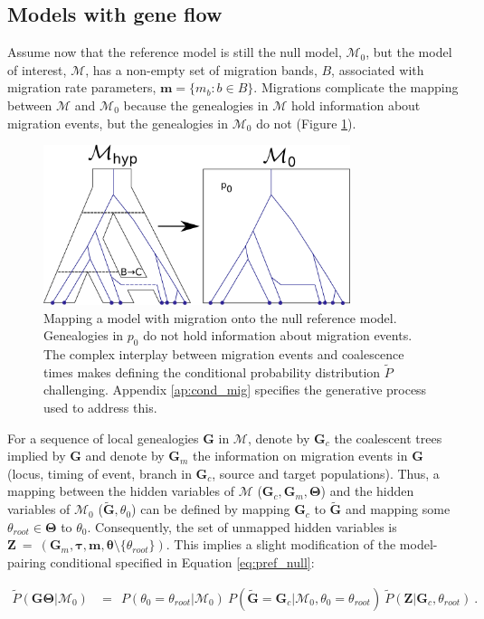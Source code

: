 \documentclass[11pt]{article}
\newcommand{\vect}[1]{\boldsymbol{\mathbf{#1}}}
\newcommand{\M}{\mathcal{M}}
\newcommand{\G}{\vect{G}}
\newcommand{\T}{\vect{\Theta}}
\newcommand{\GT}{\G\T}
\newcommand{\Pref}{\widetilde{P}}
\newcommand{\Gref}{\widetilde{\G}}
\newcommand{\1}{\mathbbm{1}}
\newcommand{\Z}{\vect{Z}}
\newcommand{\troot}{\theta_{root}}
\newcommand{\Gc}{\G_c}
\newcommand{\Gm}{\G_m}
\newcommand{\taus}{\vect\tau}
\newcommand{\thetas}{\vect\theta}
\newcommand{\migs}{\vect{m}}
\begin{document}
\subsection{Models with gene flow}

Assume now that the reference model is still the null model, $\M_0$, but the model of interest, $\M$, has a non-empty set of migration bands, $B$, associated with migration rate parameters, $\migs=\{m_b:b\in B\}$.
%
Migrations complicate the mapping between $\M$ and $\M_0$ because the genealogies in $\M$ hold information
about migration events, but the genealogies in $\M_0$ do not (Figure \ref{fig:null_model_with_migration}).
%


\begin{figure}[h]
\centering
\includegraphics[width=0.8\textwidth]
{null_model_with_migration}
\captionsetup{width=.8\textwidth}
\caption{Mapping a model with migration onto the null reference model. Genealogies in $p_0$ do not hold information about migration events. The complex interplay between migration events and coalescence times makes defining the conditional probability distribution $\Pref$ challenging. Appendix \ref{ap:cond_mig} specifies the generative process used to address this. }
\label{fig:null_model_with_migration}
\end{figure}




For a sequence of local genealogies $\G$ in $\M$, denote by $\Gc$ the coalescent trees implied by $\G$
and denote by $\Gm$ the information on migration events in $\G$ (locus, timing of event, branch in $\Gc$, source and target populations).
%
Thus, a mapping between the hidden variables of $\M$ ($\Gc,\Gm,\T$) and the hidden variables of $\M_0$ ($\Gref,\theta_0$) can be defined by
mapping $\Gc$ to $\Gref$ and mapping some $\troot\in\T$ to $\theta_0$.
%
Consequently, the set of unmapped hidden variables is $\Z~=~ (\Gm,\taus,\migs,\thetas\setminus\{\troot\})$.
%
This implies a slight modification of the model-pairing conditional specified in Equation \ref{eq:pref_null}:
%
%
\begin{small}
\begin{align}
 \Pref(\GT|\M_0)
 &=~~ 
 P(\theta_0=\troot|\M_0)\  P(\Gref=\Gc|\M_0,\theta_0=\troot)\ \Pref(\Z|\Gc,\troot)  ~ .\label{eq:pref_mig}
\end{align}
\end{small}
\end{document}
